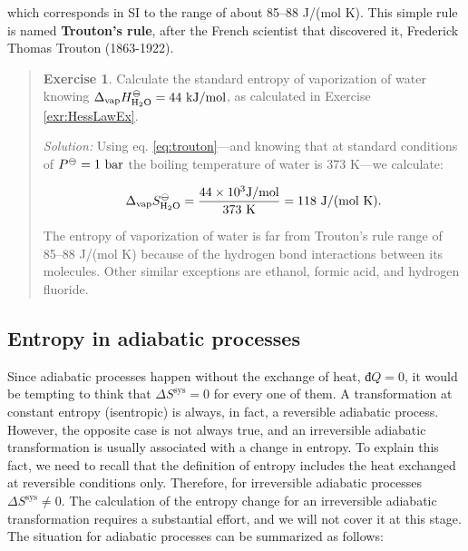 \documentclass[
  9pt,
]{extbook}
\theoremstyle{definition}
\theoremstyle{definition}
\theoremstyle{definition}
\newtheorem{exercise}{Exercise}[chapter]
\theoremstyle{remark}
\begin{document}
which corresponds in SI to the range of about 85--88 J/(mol K). This simple rule is named \textbf{Trouton's rule}, after the French scientist that discovered it, Frederick Thomas Trouton (1863-1922).

\begin{quote}
\begin{exercise}
\protect\hypertarget{exr:troutonex}{}{\label{exr:troutonex} }Calculate the standard entropy of vaporization of water knowing \(\Delta_{\mathrm{vap}} H_{\mathrm{H}_2\mathrm{O}}^{-\kern-6pt{\ominus}\kern-6pt-}= 44 \  \text{kJ/mol}\), as calculated in Exercise \ref{exr:HessLawEx}.

\emph{Solution:} Using eq. \eqref{eq:trouton}---and knowing that at standard conditions of \(P^{-\kern-6pt{\ominus}\kern-6pt-}= 1 \  \text{bar}\) the boiling temperature of water is 373 K---we calculate:

\begin{equation}
\Delta_{\mathrm{vap}} S_{\mathrm{H}_2\mathrm{O}}^{-\kern-6pt{\ominus}\kern-6pt-}= \frac{44 \times 10^3 \text{J/mol}}{373 \ \text{K}} = 118 \  \text{J/(mol K)}.
\label{eq:trouton1}
\end{equation}

The entropy of vaporization of water is far from Trouton's rule range of 85--88 J/(mol K) because of the hydrogen bond interactions between its molecules. Other similar exceptions are ethanol, formic acid, and hydrogen fluoride.
\end{exercise}
\end{quote}

\hypertarget{entropy-in-adiabatic-processes}{%
\subsection{Entropy in adiabatic processes}\label{entropy-in-adiabatic-processes}}

Since adiabatic processes happen without the exchange of heat, \(đQ=0\), it would be tempting to think that \(\Delta S^{\mathrm{sys}} = 0\) for every one of them. A transformation at constant entropy (isentropic) is always, in fact, a reversible adiabatic process. However, the opposite case is not always true, and an irreversible adiabatic transformation is usually associated with a change in entropy. To explain this fact, we need to recall that the definition of entropy includes the heat exchanged at reversible conditions only. Therefore, for irreversible adiabatic processes \(\Delta S^{\mathrm{sys}} \neq 0\). The calculation of the entropy change for an irreversible adiabatic transformation requires a substantial effort, and we will not cover it at this stage. The situation for adiabatic processes can be summarized as follows:
\end{document}

